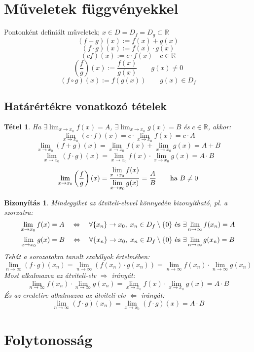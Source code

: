 \documentclass[a4paper,12pt,twoside]{book}
\newtheorem{tetel}{Tétel}[chapter]
\theoremstyle{break}
\newtheorem{biz}{Bizonyítás}[chapter]
\theoremstyle{plain}
\begin{document}
\section{Műveletek függvényekkel}

Pontonként definiált műveletek; $x\in D = D_f = D_g \subset \mathbb{R}$
\[(f+g)(x) := f(x)+g(x)\]
\[(f\cdot g)(x) := f(x)\cdot g(x)\]
\[(cf)(x) := c\cdot f(x) \quad c\in\mathbb{R}\]
\[\left(\frac{f}{g}\right)(x) := \frac{f(x)}{g(x)} \qquad g(x)\neq 0\]
\[(f\circ g)(x) := f(g(x)) \qquad g(x)\in D_f\]

\subsection{Határértékre vonatkozó tételek}

\begin{tetel}
 Ha $\displaystyle \exists \lim_{x\to x_0} f(x) = A$, $\displaystyle \exists \lim_{x\to x_0} g(x) = B$ és $c\in\mathbb{R}$, akkor:
 \[\lim_{x\to x_0} (c\cdot f)(x) = c\cdot \lim_{x\to x_0} f(x) = c\cdot A\]
 \[\lim_{x\to x_0} (f+g)(x) = \lim_{x\to x_0} f(x) + \lim_{x\to x_0} g(x) = A+B\]
 \[\lim_{x\to x_0} (f\cdot g)(x) = \lim_{x\to x_0} f(x)\cdot \lim_{x\to x_0} g(x) = A\cdot B\]
 \[\lim_{x\to x_0} \left(\frac{f}{g}\right)(x) = \frac{\displaystyle\lim_{x\to x_0} f(x)}{\displaystyle\lim_{x\to x_0} g(x)} = \frac{A}{B} \qquad \hbox{ha } B\neq 0\]
\end{tetel}
\begin{biz}
 Mindegyiket az átviteli-elvvel könnyedén bizonyítható, pl. a szorzatra:\\
\[\lim_{x\to x_0} f(x) = A \quad \Leftrightarrow \quad \forall \{x_n\}\to x_0,\; x_n\in D_f\setminus\{0\} \hbox{ és } \exists \lim_{n\to\infty} f(x_n) = A\]
\[\lim_{x\to x_0} g(x) = B \quad \Leftrightarrow \quad \forall \{x_n\}\to x_0,\; x_n\in D_f\setminus\{0\} \hbox{ és } \exists \lim_{n\to\infty} g(x_n) = B\]
Tehát a sorozatokra tanult szabályok értelmében:
\[\lim_{n\to \infty} (f\cdot g)(x_n) = \lim_{n\to \infty} (f(x_n)\cdot g(x_n)) = \lim_{n\to \infty} f(x_n)\cdot \lim_{n\to \infty} g(x_n)\]
Most alkalmazva az átviteli-elv $\Rightarrow$ irányát:
\[\lim_{n\to \infty} f(x_n)\cdot \lim_{n\to \infty} g(x_n) = \lim_{x\to x_0} f(x)\cdot \lim_{x\to x_0} g(x) = A\cdot B\]
És az eredetire alkalmazva az átviteli-elv $\Leftarrow$ irányát:
\[\lim_{n\to \infty} (f\cdot g)(x_n) = \lim_{x\to x_0} (f\cdot g)(x) = A\cdot B\]
\end{biz}


\section{Folytonosság}
\end{document}
